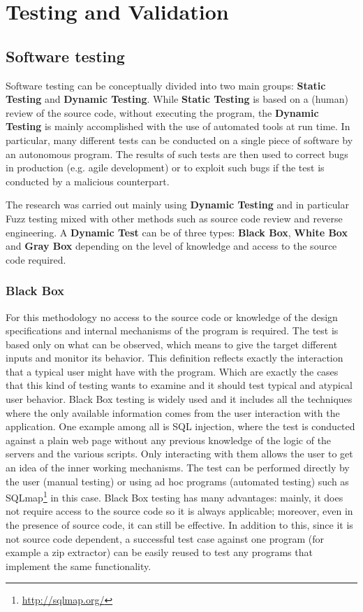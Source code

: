 \documentclass[../main.tex]{subfiles}
\begin{document}
\chapter{Testing and Validation}

\label{chap:fuzzing}

\section{Software testing}

Software testing can be conceptually divided into two main groups: \textbf{Static Testing} and \textbf{Dynamic Testing}. While \textbf{Static Testing} is based on a (human) review of the source code, without executing the program, the \textbf{Dynamic Testing} is mainly accomplished with the use of automated tools at run time. In particular, many different tests can be conducted on a single piece of software by an autonomous program. The results of such tests are then used to correct bugs in production (e.g. agile development) or to exploit such bugs if the test is conducted by a malicious counterpart.

The research was carried out mainly using \textbf{Dynamic Testing} and in particular Fuzz testing mixed with other methods such as source code review and reverse engineering. A \textbf{Dynamic Test} can be of three types: \textbf{Black Box}, \textbf{White Box} and \textbf{Gray Box} depending on the level of knowledge and access to the source code required.

\subsection{Black Box}

For this methodology no access to the source code or knowledge of the design
specifications and internal mechanisms of the program is required. The test is
based only on what can be observed, which means to give the target different
inputs and monitor its behavior. This definition reflects exactly the
interaction that a typical user might have with the program. Which are exactly
the cases that this kind of testing wants to examine and it should test typical
and atypical user behavior. Black Box testing is widely used and it includes all
the techniques where the only available information comes from the user
interaction with the application. One example among all is SQL injection, where
the test is conducted against a plain web page without any previous knowledge of
the logic of the servers and the various scripts. Only interacting with them
allows the user to get an idea of the inner working mechanisms. The test can be
performed directly by the user (manual testing) or using ad hoc programs
(automated testing) such as SQLmap\footnote{\url{http://sqlmap.org/}} in this case.
Black Box testing has many advantages: mainly, it does not require access to the
source code so it is always applicable; moreover, even in the presence of source
code, it can still be effective. In addition to this, since it is not source code dependent, a successful test case against one program (for example a zip extractor) can be easily reused to test any programs that implement the same functionality.
\end{document}
